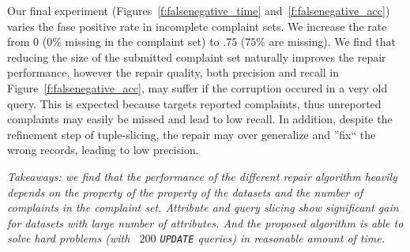 Our final experiment (Figures~\ref{f:falsenegative_time} and~\ref{f:falsenegative_acc}) varies the fase positive rate in incomplete complaint sets.
We increase the rate from $0$ ($0\%$ missing in the complaint set) to $.75$ ($75\%$ are missing).  
We find that reducing the size of the submitted complaint set naturally improves the repair performance,
however the repair quality, both precision and recall in Figure~\ref{f:falsenegative_acc}, may suffer if the corruption occured in a very old query. 
This is expected because \sys targets reported complaints, thus unreported complaints may easily be missed and lead to low recall.
In addition, despite the refinement step of tuple-slicing, the repair may over generalize and ''fix`` the wrong records, leading to low precision.


% 

\smallskip

\textit{Takeaways: we find that the performance of the different repair algorithm 
heavily depends on the property of the property of the datasets and the 
number of complaints in the complaint set. Attribute and query slicing show significant gain for 
datasets with large number of attributes. And the proposed \sys algorithm is able to solve hard problems
(with ~$200$ \texttt{UPDATE} queries) in reasonable amount of time. }













